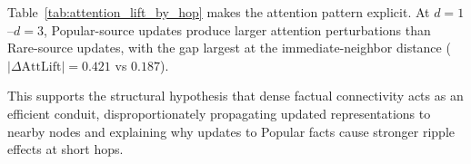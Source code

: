 Table~\ref{tab:attention_lift_by_hop} makes the attention pattern explicit. 
At $d=1$--$d=3$, Popular-source updates produce larger attention perturbations than Rare-source updates, with the gap largest at the immediate-neighbor distance ($|\Delta \mathrm{AttLift}| = 0.421$ vs $0.187$). 

This supports the structural hypothesis that dense factual connectivity acts as an efficient conduit, disproportionately propagating updated representations to nearby nodes and explaining why updates to Popular facts cause stronger ripple effects at short hops.






